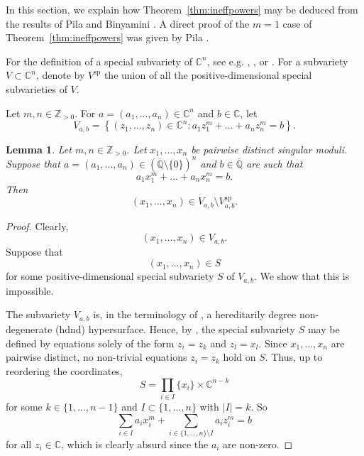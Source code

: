 \documentclass[11pt,a4paper, british]{amsart}
\newtheorem{lem}[thm]{Lemma}
\theoremstyle{definition}
\theoremstyle{remark}
\numberwithin{equation}{section}
\newcommand{\alg}{\overline{\mathbb{Q}}} %
\newcommand{\Z}{\mathbb{Z}} %
\newcommand{\C}{\mathbb{C}} %
\begin{document}
In this section, we explain how Theorem~\ref{thm:ineffpowers} may be deduced from the results of Pila \cite[Theorem~13.2]{Pila11} and Binyamini \cite[Corollary~4]{Binyamini19}. A direct proof of the $m = 1$ case of Theorem~\ref{thm:ineffpowers} was given by Pila \cite[Theorem~7.7]{Pila14a}.

For the definition of a special subvariety of $\C^n$, see e.g. \cite[Definition~1.3]{Pila11}, \cite[(1.1)]{Binyamini19}, or \cite[Definition~4.10]{Pila22}. For a subvariety $V \subset \C^n$, denote by $V^\mathrm{sp}$ the union of all the positive-dimensional special subvarieties of $V$. 

Let $m, n \in \Z_{>0}$. For $a = (a_1, \ldots, a_n) \in \C^n$ and $b \in \C$, let
\[ V_{a, b} = \left\{\left(z_1, \ldots, z_n\right) \in \C^n :a_1 z_1^m + \ldots + a_n z_n^m = b \right\}.\]



\begin{lem}\label{lem:specials}
	Let $m, n \in \Z_{>0}$. Let $x_1, \ldots, x_n$ be pairwise distinct singular moduli. Suppose that $a = (a_1, \ldots, a_n) \in (\alg \setminus \{0\})^n$ and $b \in \alg$ are such that
	\[ a_1 x_1^m + \ldots + a_n x_n^m = b.\]
	Then
	\[ (x_1, \ldots, x_n) \in V_{a, b} \setminus V_{a, b}^\mathrm{sp}.\]
\end{lem}

\begin{proof}
	Clearly, 
	\[ (x_1, \ldots, x_n) \in V_{a, b}. \]
	Suppose that 
	\[(x_1, \ldots, x_n) \in S\]
	for some positive-dimensional special subvariety $S$ of $V_{a, b}$.	We show that this is impossible. 
	
	The subvariety $V_{a, b}$ is, in the terminology of \cite[Definition~2]{Binyamini19}, a hereditarily degree non-degenerate (hdnd) hypersurface. Hence, by \cite[Corollary~4]{Binyamini19}, the special subvariety $S$ may be defined by equations solely of the form $z_i = z_k$ and $z_l = x_l$. Since $x_1, \ldots, x_n$ are pairwise distinct, no non-trivial equations $z_i = z_k$ hold on $S$. Thus, up to reordering the coordinates,
	\[ S = \prod_{i \in I} \{x_i\} \times \C^{n-k}\]
	for some $k \in \{1, \ldots, n-1\}$ and $I \subset \{1, \ldots, n\}$ with $\lvert I \rvert = k$. So
	\[ \sum_{i \in I} a_i x_i^m + \sum_{i \in \{1, \ldots, n\} \setminus I} a_i z_i^m = b\]
	for all $z_i \in \C$, which is clearly absurd since the $a_i$ are non-zero.
\end{proof}
\end{document}

